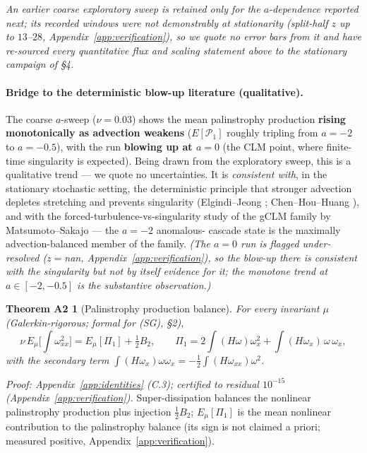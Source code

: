 \documentclass[11pt]{article}
\theoremstyle{remark}
\theoremstyle{plain}
\newtheorem*{thmA2}{Theorem A2}
\begin{document}
\emph{An earlier coarse exploratory sweep is retained only for the $a$-dependence
reported next; its recorded windows were not demonstrably at stationarity (split-half
$z$ up to $13$--$28$, Appendix~\ref{app:verification}), so we quote no error bars from it and have re-sourced every
quantitative flux and scaling statement above to the stationary campaign of \S4.}

\paragraph{Bridge to the deterministic blow-up literature (qualitative).} The coarse
$a$-sweep ($\nu=0.03$) shows the mean palinstrophy production \textbf{rising monotonically
as advection weakens} ($E[\mathcal{P}_1]$ roughly tripling from $a=-2$ to $a=-0.5$), with the
run \textbf{blowing up at $a=0$} (the CLM point, where finite-time singularity is expected).
Being drawn from the exploratory sweep, this is a qualitative trend --- we quote no
uncertainties. It is \emph{consistent with}, in the stationary stochastic setting,
the deterministic principle that stronger advection depletes stretching and
prevents singularity (Elgindi--Jeong \cite{ElgindiJeong2020}; Chen--Hou--Huang \cite{CHH2021}), and with the
forced-turbulence-vs-singularity study of the gCLM family by
Matsumoto--Sakajo \cite{MS2017} --- the $a=-2$ anomalous-
cascade state is the maximally advection-balanced member of the family. \emph{(The $a=0$
run is flagged under-resolved ($z=$nan, Appendix~\ref{app:verification}), so the blow-up there is consistent with
the singularity but not by itself evidence for it; the monotone trend at
$a\in[-2,-0.5]$ is the substantive observation.)}

\begin{thmA2}[Palinstrophy production balance]
For every invariant $\mu$ (Galerkin-rigorous; formal for (SG), \S2),
\begin{equation}
   \nu\, E_\mu\bigl[\textstyle\int\omega_{xx}^2\bigr] = E_\mu[\Pi_1] + \tfrac12 B_2, \qquad
   \Pi_1 = 2\int(H\omega)\omega_x^2 + \int(H\omega_x)\,\omega\,\omega_x,
\end{equation}
with the secondary term $\int(H\omega_x)\omega\omega_x = -\tfrac12\int(H\omega_{xx})\omega^2$.
\end{thmA2}

\emph{Proof: Appendix~\ref{app:identities} (C.3); certified to residual $10^{-15}$ (Appendix~\ref{app:verification}).}
Super-dissipation balances the nonlinear palinstrophy production plus injection
$\tfrac12 B_2$; $E_\mu[\Pi_1]$ is the mean nonlinear contribution to the palinstrophy
balance (its sign is not claimed a priori; measured positive, Appendix~\ref{app:verification}).
\end{document}
